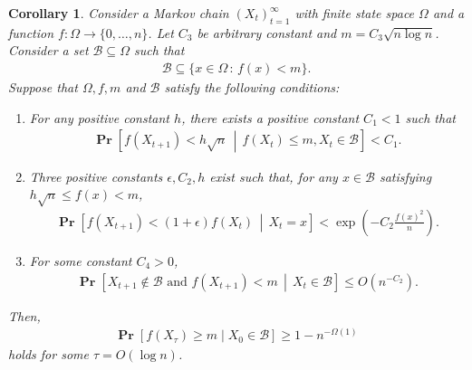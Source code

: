 \documentclass[letterpaper,11pt]{article}
\newtheorem{corollary}[theorem]{Corollary}
\renewcommand\Pr{\mathop{\mathbf{Pr}}}
\begin{document}
\begin{corollary} \label{cor:nazocor}
Consider a Markov chain $(X_t)_{t=1}^\infty$ with finite state space $\Omega$ and a function $f:\Omega \to \{0,\ldots,n\}$.
Let $C_3$ be arbitrary constant and $m=C_3 \sqrt{n\log n}$.
Consider a set $\mathcal{B}\subseteq \Omega$ such that
\begin{align*}
\mathcal{B}\subseteq \{x\in \Omega\,:\,f(x)< m\}.
\end{align*}
Suppose that $\Omega,f,m$ and $\mathcal{B}$ satisfy the following conditions:

\begin{enumerate}[label=$(\arabic*')$]
\item\label{cond:nazo_sqrt} For any positive constant $h$, there exists a positive constant $C_1<1$ such that
\begin{align*}
\Pr\left[f(X_{t+1})<h\sqrt{n}\,\middle|\,f(X_t)\leq m,X_t\in\mathcal{B}\right] < C_1.
\end{align*}

\item\label{cond:chernoff} Three positive constants $\epsilon, C_2,h$ exist such that, for any $x\in \mathcal{B}$ satisfying $h\sqrt{n}\leq f(x)<m$,
\begin{align*}
\Pr\left[f(X_{t+1})< (1+\epsilon)f(X_t) \,\middle|\, X_t=x\right] < \exp\left(-C_2\frac{f(x)^2}{n}\right).
\end{align*}

\item\label{cond:whp} For some constant $C_4>0$,
\begin{align*}
\Pr\left[X_{t+1}\not\in\mathcal{B}\text{ and } f(X_{t+1})< m\,\middle|\,X_t\in\mathcal{B}\right] \leq O(n^{-C_2}).
\end{align*}
\end{enumerate}

Then, 
\begin{align*}
\Pr\left[f(X_\tau) \geq m \mid X_0\in \mathcal{B}\right]\geq 1-n^{-\Omega(1)}
\end{align*}
holds for some $\tau=O(\log n)$.
\end{corollary}
\end{document}
